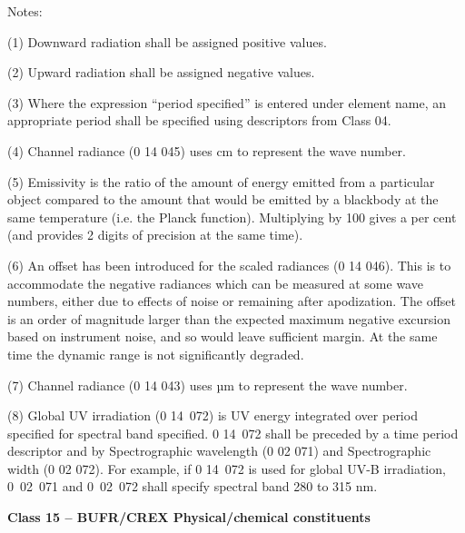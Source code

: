 Notes:

(1) Downward radiation shall be assigned positive values.

(2) Upward radiation shall be assigned negative values.

(3) Where the expression ``period specified'' is entered under element name, an appropriate period shall be specified using descriptors from Class 04.

(4) Channel radiance (0 14 045) uses cm to represent the wave number.

(5) Emissivity is the ratio of the amount of energy emitted from a particular object compared to the amount that would be emitted by a blackbody at the same temperature (i.e. the Planck function). Multiplying by 100 gives a per cent (and provides 2 digits of precision at the same time).

(6) An offset has been introduced for the scaled radiances (0 14 046). This is to accommodate the negative radiances which can be measured at some wave numbers, either due to effects of noise or remaining after apodization. The offset is an order of magnitude larger than the expected maximum negative excursion based on instrument noise, and so would leave sufficient margin. At the same time the dynamic range is not significantly degraded.

(7) Channel radiance (0 14 043) uses µm to represent the wave number.

(8) Global UV irradiation (0 14~072) is UV energy integrated over period specified for spectral band specified. 0 14~072 shall be preceded by a time period descriptor and by Spectrographic wavelength (0 02 071) and Spectrographic width (0 02 072). For example, if 0 14~072 is used for global UV-B irradiation, 0~02~071 and 0~02~072 shall specify spectral band 280 to 315 nm.

\textbf{Class 15 -- BUFR/CREX Physical/chemical constituents}

